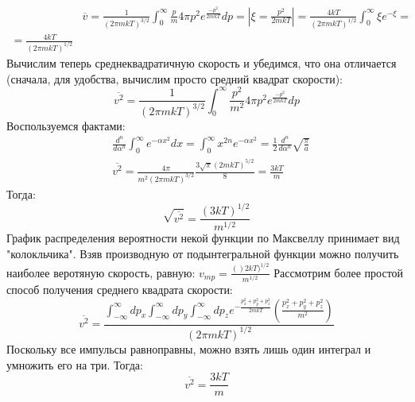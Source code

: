 \documentclass[a4paper, 12pt]{article}
\begin{document}
	\begin{equation*}
		\begin{aligned}
			& \overline{v} = \frac{1}{ (2 \pi mkT)^{3/2}} \int_{0}^{\infty} \frac{p}{m} 4 \pi p^{2}  e^{\frac{-p^{2}}{2mkT}}dp = |\xi  =  \frac{p^{2}}{2mkT}| = \frac{4kT}{(2 \pi mkT)^{1/2}} \int_{0}^{\infty} \xi e^{-\xi}  = &   \\
			= \frac{4kT}{(2 \pi mkT)^{1/2}}
		\end{aligned}
	\end{equation*}
	Вычислим теперь среднеквадратичную скорость и убедимся, что она отличается (сначала, для удобства, вычислим просто средний квадрат скорости):
	\begin{equation*}
		\overline{v^{2}} = \frac{1}{ (2 \pi mkT)^{3/2}} \int_{0}^{\infty} \frac{p^{2}}{m^{2}} 4 \pi p^{2}  e^{\frac{-p^{2}}{2mkT}}dp 
	\end{equation*}
	Воспользуемся фактами: 
	\begin{equation*}
		\begin{aligned}
			& \frac{d^{n}}{d \alpha^{n}} \int_{0}^{\infty} e^{-\alpha x^{2}} dx = \int_{0}^{\infty} x^{2n} e^{-\alpha x^{2}} = \frac{1}{2} \frac{d^{n}}{d\alpha^{n}}\sqrt{\frac{\pi}{a}} \\
			& \overline{v^{2}} = \frac{4\pi}{m^{2} (2\pi mkT)^{3/2}} \frac{3 \sqrt{\pi} (2mkT)^{5/2}} {8} = \frac{3kT}{m}                                                                
		\end{aligned}
	\end{equation*}
	Тогда:
	\begin{equation*}
		\sqrt{\overline{v^{2}}} =   \frac{(3kT)^{1/2}}{m^{1/2}}
	\end{equation*}
	График распределения вероятности некой функции по Максвеллу принимает вид "колокльчика".
	Взяв производную от подынтегральной функции можно получить наиболее веротяную скорость, равную: $v_{mp} = \frac{()2kT)^{1/2}}{m^{1/2}}$
	Рассмотрим более простой способ  получения среднего квадрата скорости:
	\begin{equation*}
		\overline{v^{2}} = \frac{\int_{-\infty}^{\infty} dp_{x}  \int_{-\infty}^{\infty} dp_{y} \int_{-\infty}^{\infty} dp_{z} e^{- \frac{p_{x}^2+p_{y}^2+p_{z}^{2}}{2mkT}} (\frac{p_{x}^2+p_{y}^2+p_{z}^{2}}{m^2}) }{(2 \pi  m k T )^{1/2}}
	\end{equation*}
	Поскольку все импульсы равноправны, можно взять лишь один интеграл и умножить его на три. Тогда: 
	\begin{equation*}
		\overline{v^{2}} =   \frac{3kT}{m}
	\end{equation*}
\end{document}
